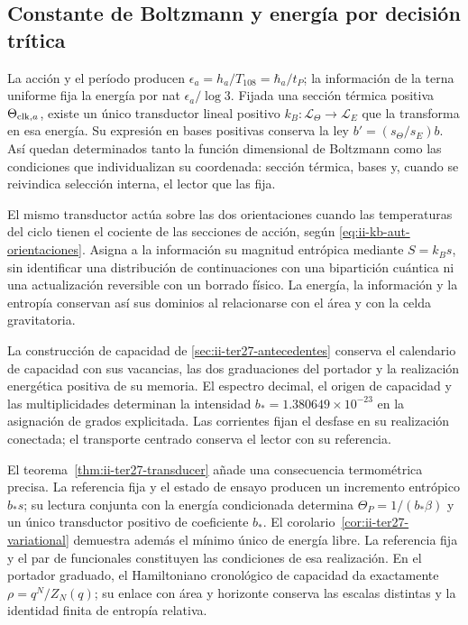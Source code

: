 \subsection{Constante de Boltzmann y energía por decisión trítica}

La acción y el período producen
\(\epsilon_a=h_a/T_{108}=\hbar_a/t_P\); la información de la terna
uniforme fija la energía por nat \(\epsilon_a/\log3\).
Fijada una sección térmica positiva \(\Theta_{{\rm clk},a}\),
existe un único transductor lineal positivo
\(k_B:\mathcal L_\Theta\to\mathcal L_E\) que la transforma en esa
energía. Su expresión en bases positivas conserva la ley
\(b'=(s_\Theta/s_E)b\). Así quedan determinados tanto la función
dimensional de Boltzmann como las condiciones que individualizan su
coordenada: sección térmica, bases y, cuando se reivindica selección
interna, el lector que las fija.

El mismo transductor actúa sobre las dos orientaciones cuando las
temperaturas del ciclo tienen el cociente de las secciones de acción,
según \eqref{eq:ii-kb-aut-orientaciones}. Asigna a la información
su magnitud entrópica mediante \(S=k_Bs\), sin identificar una distribución
de continuaciones con una bipartición cuántica ni una actualización
reversible con un borrado físico. La energía, la información y la
entropía conservan así sus dominios al relacionarse con el área y
con la celda gravitatoria.

La construcción de capacidad de \ref{sec:ii-ter27-antecedentes} conserva el calendario
de capacidad con sus vacancias, las dos graduaciones del portador y la
realización energética positiva de su memoria. El espectro decimal, el
origen de capacidad y las multiplicidades determinan la intensidad
\(b_*=1.380649\times10^{-23}\) en la asignación de grados explicitada.
Las corrientes fijan el desfase en su realización conectada; el transporte
centrado conserva el lector con su referencia.

El teorema~\ref{thm:ii-ter27-transducer} añade una consecuencia
termométrica precisa. La referencia fija y el estado de ensayo producen
un incremento entrópico \(b_*s\); su lectura conjunta con la energía
condicionada determina \(\Theta_P=1/(b_*\beta)\) y un único
transductor positivo de coeficiente \(b_*\). El
corolario~\ref{cor:ii-ter27-variational} demuestra además el mínimo
único de energía libre. La referencia fija y el par de funcionales
constituyen las condiciones de esa realización. En el portador graduado,
el Hamiltoniano cronológico de capacidad da exactamente
\(\rho=q^N/Z_N(q)\); su enlace con área y horizonte conserva las
escalas distintas y la identidad finita de entropía relativa.

